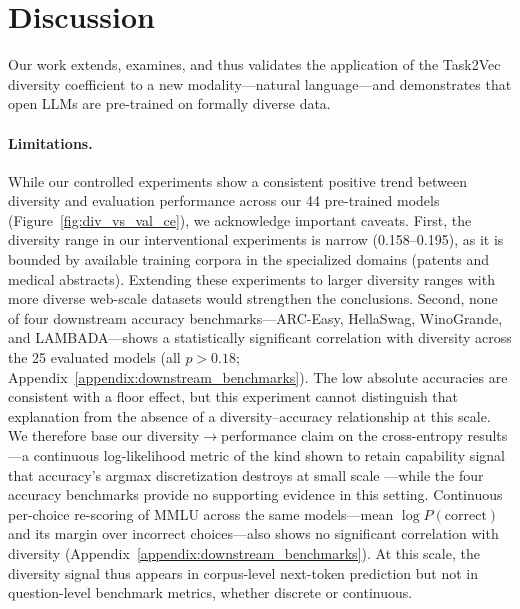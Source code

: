 \section{Discussion}
Our work extends, examines, and thus validates the application of the Task2Vec diversity coefficient to a new modality---natural language---and demonstrates that open LLMs are pre-trained on formally diverse data.

\paragraph{Limitations.}
While our controlled experiments show a consistent positive trend between diversity and evaluation performance across our 44 pre-trained models (Figure~\ref{fig:div_vs_val_ce}), we acknowledge important caveats.
First, the diversity range in our interventional experiments is narrow (0.158--0.195), as it is bounded by available training corpora in the specialized domains (patents and medical abstracts).
Extending these experiments to larger diversity ranges with more diverse web-scale datasets would strengthen the conclusions.
Second, none of four downstream accuracy benchmarks---ARC-Easy, HellaSwag, WinoGrande, and LAMBADA---shows a statistically significant correlation with diversity across the 25 evaluated models (all $p>0.18$; Appendix~\ref{appendix:downstream_benchmarks}).
The low absolute accuracies are consistent with a floor effect, but this experiment cannot distinguish that explanation from the absence of a diversity--accuracy relationship at this scale.
We therefore base our diversity$\to$performance claim on the cross-entropy results---a continuous log-likelihood metric of the kind shown to retain capability signal that accuracy's argmax discretization destroys at small scale \citep{schaeffer2024elusive}---while the four accuracy benchmarks provide no supporting evidence in this setting.
Continuous per-choice re-scoring of MMLU across the same models---mean $\log P(\mathrm{correct})$ and its margin over incorrect choices---also shows no significant correlation with diversity (Appendix~\ref{appendix:downstream_benchmarks}).
At this scale, the diversity signal thus appears in corpus-level next-token prediction but not in question-level benchmark metrics, whether discrete or continuous.

